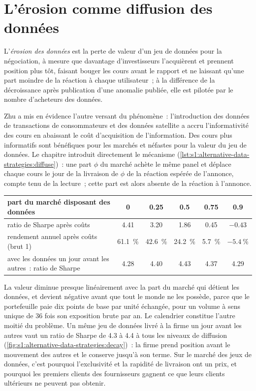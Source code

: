 \section{L'érosion comme diffusion des données}

\begin{definition}\label{def:s1:alternative-data-strategies:decay}
L'\emph{érosion des données} est la perte de valeur d'un jeu de données pour la négociation, à mesure que davantage d'investisseurs l'acquièrent et prennent position plus tôt, faisant bouger les cours avant le
rapport et ne laissant qu'une part moindre de la réaction à chaque utilisateur~; à la différence de la décroissance après publication d'une anomalie publiée, elle est pilotée par le nombre d'acheteurs des
données.
\end{definition}

Zhu a mis en évidence l'autre versant du phénomène~: l'introduction des données de transactions de consommateurs et des données satellite a accru l'informativité des cours en abaissant le coût
d'acquisition de l'information. Des cours plus informatifs sont bénéfiques pour les marchés et néfastes pour la valeur du jeu de données. Le chapitre introduit directement le mécanisme
(\cref{lst:s1:alternative-data-strategies:diffuse})~: une part $\phi$ du marché achète le même panel et déplace chaque cours le jour de la livraison de $\phi$ de la
réaction espérée de l'annonce, compte tenu de la lecture~; cette part est alors absente de la réaction à l'annonce.

\begin{center}
\small
\begin{tabular}{@{}lccccc@{}}
\toprule
part du marché disposant des données & 0 & 0.25 & 0.5 & 0.75 & 0.9\\
\midrule
ratio de Sharpe après coûts & 4.41 & 3.20 & 1.86 & 0.45 & $-0.43$\\
rendement annuel après coûts (brut 1) & 61.1~\% & 42.6~\% & 24.2~\% & 5.7~\% & $-5.4~\%$\\
\midrule
avec les données un jour avant les autres~: ratio de Sharpe & 4.28 & 4.40 & 4.43 & 4.37 & 4.29\\
\bottomrule
\end{tabular}
\end{center}

La valeur diminue presque linéairement avec la part du marché qui détient les données, et devient négative avant que tout le monde ne les possède, parce que le portefeuille paie
dix points de base par unité échangée, pour un volume à sens unique de 36 fois son exposition brute par an. Le calendrier constitue l'autre moitié du problème. Un même jeu de données livré à la firme un jour avant les autres vaut
un ratio de Sharpe de 4.3 à 4.4 à tous les niveaux de diffusion (\cref{fig:s1:alternative-data-strategies:decay})~: la firme prend position avant le mouvement des autres
et le conserve jusqu'à son terme. Sur le marché des jeux de données, c'est pourquoi l'exclusivité et la rapidité de livraison ont un prix, et pourquoi les premiers clients des fournisseurs gagnent ce que leurs
clients ultérieurs ne peuvent pas obtenir.

